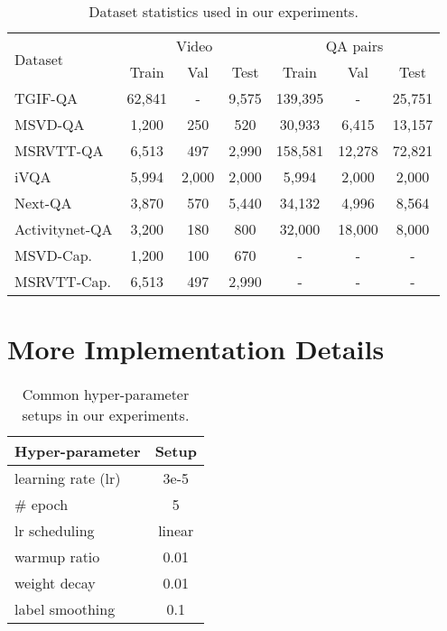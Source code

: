 \documentclass{article}
\begin{document}
\begin{table}[!h]
    \centering
    \small
    \caption{Dataset statistics used in our experiments.}
    \vskip 0.15in
\begin{adjustbox}{width=0.48\textwidth} 
    \begin{tabular}{lcccccc}
        \toprule
        \multirow{2}[3]{*}{Dataset} & \multicolumn{3}{c}{Video} & \multicolumn{3}{c}{QA pairs} \\
        \cmidrule(r){2-4} \cmidrule(r){5-7}
        & Train & Val & Test & Train & Val & Test \\
\midrule
        TGIF-QA & 62,841 & - & 9,575 & 139,395 & - & 25,751\\
        MSVD-QA & 1,200 & 250 & 520 & 30,933 & 6,415 & 13,157 \\
        MSRVTT-QA & 6,513 & 497 & 2,990 & 158,581 & 12,278 & 72,821 \\
        iVQA & 5,994 & 2,000 & 2,000 & 5,994 & 2,000 & 2,000 \\
        Next-QA & 3,870 & 570 & 5,440 & 34,132 & 4,996 & 8,564 \\
        Activitynet-QA & 3,200 & 180 & 800 & 32,000 & 18,000 & 8,000 \\
        \midrule
        MSVD-Cap. & 1,200 & 100 & 670 & - & - & - \\
        MSRVTT-Cap. & 6,513 & 497 & 2,990 & - & - & - \\
        \bottomrule
    \end{tabular}
    \end{adjustbox}
\label{table:dataset}
\end{table} 
\section{More Implementation Details}
\label{appendix:implementation}



\begin{table}[t!]
    \centering
    \small
    \caption{Common hyper-parameter setups in our experiments.}
    \vskip 0.15in
\setlength{\tabcolsep}{10pt}
    \begin{tabular}{lc}
        \toprule
        Hyper-parameter & Setup \\
        \midrule
        learning rate (lr) & 3e-5 \\
        \# epoch & 5 \\
        lr scheduling & linear \\
        warmup ratio & 0.01 \\
        weight decay & 0.01 \\
        label smoothing & 0.1 \\
        \bottomrule
    \end{tabular}
\label{table:common_hyper}
\end{table}
\end{document}
